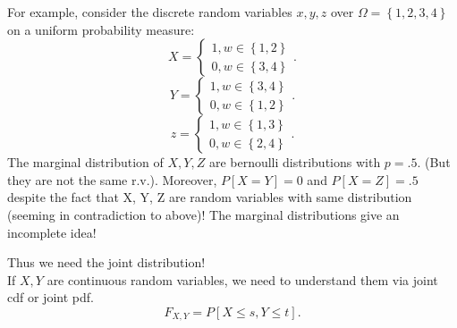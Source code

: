 \documentclass[a4paper]{article}
\begin{document}
\begin{note}
  For example, consider the discrete random variables $x,y,z$ over $\Omega = \left\{ 1,2,3,4 \right\}$ on a uniform
  probability measure:
  \[
  X = \begin{cases}
    1, w \in \left\{ 1,2 \right\} \\
    0, w \in \left\{ 3,4 \right\} 
  \end{cases}
  .\] 
  \[
  Y = \begin{cases}
    1, w \in \left\{ 3,4 \right\} \\
    0, w \in \left\{ 1,2 \right\} 
  \end{cases}
  .\] 
  \[
  z = \begin{cases}
    1, w \in \left\{ 1,3 \right\} \\
    0, w \in \left\{ 2,4 \right\} 
  \end{cases}
  .\] 
  The marginal distribution of $X,Y,Z$ are bernoulli distributions with $p = .5$. (But they are not the same r.v.).
  Moreover, $P[X=Y]= 0$ and $P[X=Z] = .5$ despite the fact that X, Y, Z are random variables with same distribution 
  (seeming in contradiction to above)! The marginal distributions give an incomplete idea!
\end{note}

Thus we need the joint distribution! \\

If $X,Y$ are continuous random variables, we need to understand them via joint cdf or joint pdf.
\[
  F_{X,Y} = P[X \leq s, Y \leq t]
.\] 
\end{document}
